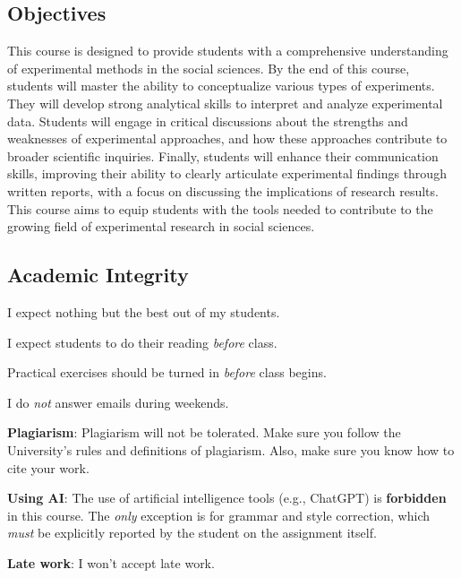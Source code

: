 \documentclass[letterpaper]{article}\usepackage[]{graphicx}\usepackage[svgnames]{xcolor}
\renewenvironment{itemize}{
  \begin{list}{}{
    \setlength{\leftmargin}{1.5em}
  }
}{
  \end{list}
}
\begin{document}
\subsection*{Objectives}

This course is designed to provide students with a comprehensive understanding of experimental methods in the social sciences. By the end of this course, students will master the ability to conceptualize various types of experiments. They will develop strong analytical skills to interpret and analyze experimental data. Students will engage in critical discussions about the strengths and weaknesses of experimental approaches, and how these approaches contribute to broader scientific inquiries. Finally, students will enhance their communication skills, improving their ability to clearly articulate experimental findings through written reports, with a focus on discussing the implications of research results. This course aims to equip students with the tools needed to contribute to the growing field of experimental research in social sciences.



\subsection*{Academic Integrity}

I expect nothing but the best out of my students. 

\begin{itemize}
     \item[$\circ$] I expect students to do their reading \emph{before} class.
     \item[$\circ$] Practical exercises should be turned in \emph{before} class begins. 

  \item[$\circ$] I do \emph{not} answer emails during weekends. 
\end{itemize}


\begin{itemize}
  \item[{\color{red}\Pointinghand}] {\bf Plagiarism}: Plagiarism will not be tolerated. Make sure you follow the University's rules and definitions of plagiarism. Also, make sure you know how to cite your work. 

\item[{\color{red}\Pointinghand}] {\bf Using AI}: The use of artificial intelligence tools (e.g., ChatGPT) is {\bf forbidden} in this course. The \emph{only} exception is for grammar and style correction, which \emph{must} be explicitly reported by the student on the assignment itself.

  \item[{\color{red}\Pointinghand}] {\bf Late work}: I won't accept late work.

\end{itemize}
\end{document}
